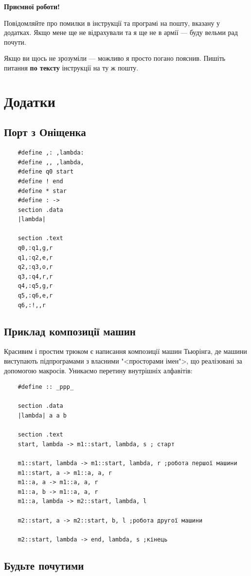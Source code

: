\documentclass[oneside,final,14pt]{extreport}
\begin{document}
\textbf{{\large Приємної роботи!}}

Повідомляйте про помилки в інструкції та програмі на пошту, вказану у додатках. Якщо мене ще не відрахували та я ще не в армії --- буду вельми рад почути.

Якщо ви щось не зрозуміли --- можливо я просто погано пояснив. Пишіть питання  {\bfseries по тексту} інструкції на ту ж пошту.

\chapter*{Додатки} 
\section*{Порт з Оніщенка}
\begin{verbatim}
	#define ,: ,lambda:
	#define ,, ,lambda,
	#define q0 start
	#define ! end
	#define * star
	#define : ->
	section .data
	|lambda|

	section .text
	q0,:q1,g,r
	q1,:q2,e,r
	q2,:q3,o,r
	q3,:q4,r,r
	q4,:q5,g,r
	q5,:q6,e,r
	q6,:!,,r
\end{verbatim}

\section*{Приклад композиції машин}
Красивим і простим трюком є написання композиції машин Тьюрінга, де машини виступають підпрограмами з власними "<просторами імен">, що реалізовані за допомогою макросів. Уникаємо перетину внутрішніх алфавітів:
\begin{verbatim}
	#define :: _ppp_

	section .data
	|lambda| a a b

	section .text
	start, lambda -> m1::start, lambda, s ; старт

	m1::start, lambda -> m1::start, lambda, r ;робота першої машини
	m1::start, a -> m1::a, a, r
	m1::a, a -> m1::a, a, r
	m1::a, b -> m1::a, a, r
	m1::a, lambda -> m2::start, lambda, l

	m2::start, a -> m2::start, b, l ;робота другої машини
			
	m2::start, lambda -> end, lambda, s ;кінець
\end{verbatim}
\section*{Будьте почутими}
\end{document}
